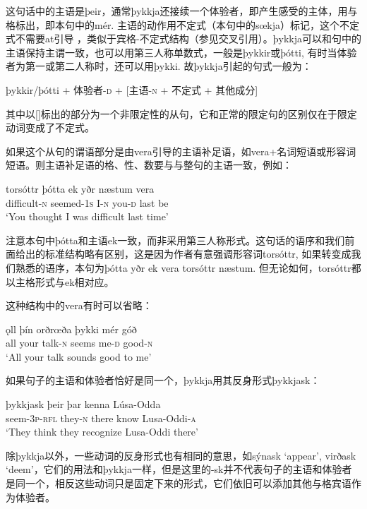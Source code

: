 这句话中的主语是þeir，通常þykkja还接续一个体验者，即产生感受的主体，用与格标出，即本句中的mér. 主语的动作用不定式（本句中的sœkja）标记，这个不定式不需要at引导 ，类似于宾格-不定式结构（参见交叉引用）。þykkja可以和句中的主语保持主谓一致，也可以用第三人称单数式，一般是þykkir或þótti, 有时当体验者为第一或第二人称时，还可以用þykki. 故þykkja引起的句式一般为：
\begin{info}
    þykkir/þótti + 体验者-\textsc{d} + [主语-\textsc{n} + 不定式 + 其他成分]
\end{info}

其中以[]标出的部分为一个非限定性的从句，它和正常的限定句的区别仅在于限定动词变成了不定式。

如果这个从句的谓语部分是由vera引导的主语补足语，如vera+名词短语或形容词短语。则主语补足语的格、性、数要与与整句的主语一致，例如：
\begin{exe}
    \ex
    \gll torsóttr	þótta	ek	yðr	næstum	vera\\
    difficult-\textsc{n}	seemed-{\footnotesize 1}\textsc{s}	I-\textsc{n}	you-\textsc{d}	last	be\\
    \trans `You thought I was difficult last time’

\end{exe}

注意本句中þótta和主语ek一致，而非采用第三人称形式。这句话的语序和我们前面给出的标准结构略有区别，这是因为作者有意强调形容词torsóttr, 如果转变成我们熟悉的语序，本句为þótta yðr ek vera torsóttr næstum. 但无论如何，torsóttr都以主格形式与ek相对应。

这种结构中的vera有时可以省略：
\begin{exe}
    \ex
    \gll ǫll	þín	orðrœða	þykki	mér	góð\\
    all	your	talk-\textsc{n}	seems	me-\textsc{d}	good-\textsc{n}\\
    \trans `All your talk sounds good to me’
\end{exe}

如果句子的主语和体验者恰好是同一个，þykkja用其反身形式þykkjask：
\begin{exe}
    \ex
    \gll þykkjask	þeir	þar	kenna	Lúsa-Odda\\
    seem-{\footnotesize 3}\textsc{p}-\textsc{rfl}	they-\textsc{n}	there	know	Lusa-Oddi-\textsc{a}\\
    \trans `They think they recognize Lusa-Oddi there’
\end{exe}

除þykkja以外，一些动词的反身形式也有相同的意思，如sýnask `appear’, virðask `deem’，它们的用法和þykkja一样，但是这里的-sk并不代表句子的主语和体验者是同一个，相反这些动词只是固定下来的形式，它们依旧可以添加其他与格宾语作为体验者。

